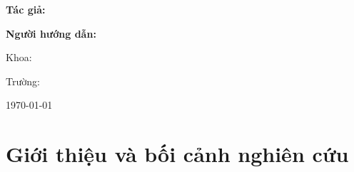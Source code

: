 
\begin{frame}
    \titlepage
\end{frame}

\begin{frame}
    \centering
    {\Large \textbf{Tác giả:} \TENTACGIA \par}
    {\Large \textbf{Người hướng dẫn:} \TENNGUOIHUONGDAN \par}
    \vspace{0.5cm}
    {\small Khoa: \KHOA \par}
    {\small Trường: \TRUONG \par}
    \vfill
    {\footnotesize \today}
\end{frame}

\section{Giới thiệu và bối cảnh nghiên cứu}

